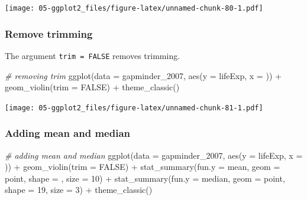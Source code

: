 \documentclass[
]{book}
\newenvironment{Shaded}{\begin{snugshade}}{\end{snugshade}}
\newcommand{\AttributeTok}[1]{\textcolor[rgb]{0.77,0.63,0.00}{#1}}
\newcommand{\CommentTok}[1]{\textcolor[rgb]{0.56,0.35,0.01}{\textit{#1}}}
\newcommand{\ConstantTok}[1]{\textcolor[rgb]{0.00,0.00,0.00}{#1}}
\newcommand{\DecValTok}[1]{\textcolor[rgb]{0.00,0.00,0.81}{#1}}
\newcommand{\FunctionTok}[1]{\textcolor[rgb]{0.00,0.00,0.00}{#1}}
\newcommand{\NormalTok}[1]{#1}
\newcommand{\SpecialCharTok}[1]{\textcolor[rgb]{0.00,0.00,0.00}{#1}}
\newcommand{\StringTok}[1]{\textcolor[rgb]{0.31,0.60,0.02}{#1}}
\begin{document}
\texttt{[image: 05-ggplot2\_files/figure-latex/unnamed-chunk-80-1.pdf]}

\hypertarget{remove-trimming}{%
\subsubsection{Remove trimming}\label{remove-trimming}}

The argument \texttt{trim\ =\ FALSE} removes trimming.

\begin{Shaded}
\begin{Highlighting}[]
\CommentTok{\# removing trim}
\FunctionTok{ggplot}\NormalTok{(}\AttributeTok{data =}\NormalTok{ gapminder\_2007, }\FunctionTok{aes}\NormalTok{(}\AttributeTok{y =}\NormalTok{ lifeExp, }\AttributeTok{x =} \StringTok{\textquotesingle{}\textquotesingle{}}\NormalTok{)) }\SpecialCharTok{+} 
   \FunctionTok{geom\_violin}\NormalTok{(}\AttributeTok{trim =} \ConstantTok{FALSE}\NormalTok{) }\SpecialCharTok{+}
   \FunctionTok{theme\_classic}\NormalTok{()}
\end{Highlighting}
\end{Shaded}

\texttt{[image: 05-ggplot2\_files/figure-latex/unnamed-chunk-81-1.pdf]}

\hypertarget{adding-mean-and-median-1}{%
\subsubsection{Adding mean and median}\label{adding-mean-and-median-1}}

\begin{Shaded}
\begin{Highlighting}[]
\CommentTok{\# adding mean and median}
\FunctionTok{ggplot}\NormalTok{(}\AttributeTok{data =}\NormalTok{ gapminder\_2007, }\FunctionTok{aes}\NormalTok{(}\AttributeTok{y =}\NormalTok{ lifeExp, }\AttributeTok{x =} \StringTok{\textquotesingle{}\textquotesingle{}}\NormalTok{)) }\SpecialCharTok{+} 
   \FunctionTok{geom\_violin}\NormalTok{(}\AttributeTok{trim =} \ConstantTok{FALSE}\NormalTok{) }\SpecialCharTok{+}
   \FunctionTok{stat\_summary}\NormalTok{(}\AttributeTok{fun.y =}\NormalTok{ mean, }\AttributeTok{geom =} \StringTok{\textquotesingle{}point\textquotesingle{}}\NormalTok{, }\AttributeTok{shape =} \StringTok{\textquotesingle{}{-}\textquotesingle{}}\NormalTok{, }\AttributeTok{size =} \DecValTok{10}\NormalTok{) }\SpecialCharTok{+}
   \FunctionTok{stat\_summary}\NormalTok{(}\AttributeTok{fun.y =}\NormalTok{ median, }\AttributeTok{geom =} \StringTok{\textquotesingle{}point\textquotesingle{}}\NormalTok{, }\AttributeTok{shape =} \DecValTok{19}\NormalTok{, }\AttributeTok{size =} \DecValTok{3}\NormalTok{) }\SpecialCharTok{+}
   \FunctionTok{theme\_classic}\NormalTok{() }
\end{Highlighting}
\end{Shaded}
\end{document}
